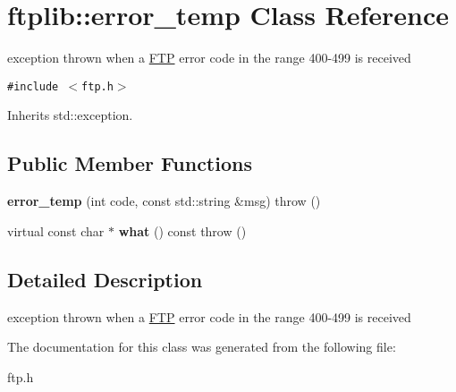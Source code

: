 \hypertarget{classftplib_1_1error__temp}{
\section{ftplib::error\_\-temp Class Reference}
\label{classftplib_1_1error__temp}
}
exception thrown when a \hyperlink{classftplib_1_1FTP}{FTP} error code in the range 400-499 is received  


{\tt \#include $<$ftp.h$>$}

Inherits std::exception.

\subsection*{Public Member Functions}
\begin{CompactItemize}
\item 
\hypertarget{classftplib_1_1error__temp_6c8a81fc949ee5591a85d5efeb492ea2}{
\textbf{error\_\-temp} (int code, const std::string \&msg)  throw ()}
\label{classftplib_1_1error__temp_6c8a81fc949ee5591a85d5efeb492ea2}

\item 
\hypertarget{classftplib_1_1error__temp_b34a46f6d2b57061eaa5c00d9cf946b0}{
virtual const char $\ast$ \textbf{what} () const   throw ()}
\label{classftplib_1_1error__temp_b34a46f6d2b57061eaa5c00d9cf946b0}

\end{CompactItemize}


\subsection{Detailed Description}
exception thrown when a \hyperlink{classftplib_1_1FTP}{FTP} error code in the range 400-499 is received 

The documentation for this class was generated from the following file:\begin{CompactItemize}
\item 
ftp.h\end{CompactItemize}
